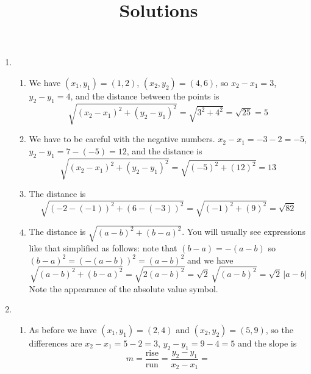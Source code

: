 \documentclass{article}
\title{\commonPSTitleZeroZeroB\ Solutions}
\author{\commonAuthor}
\date{\commonDateZeroZeroB}
\newcommand{\ds}{\displaystyle}
\begin{document}
\maketitle
\begin{enumerate}
\item %
  \begin{enumerate}
  \item %
    We have $(x_1,y_1)=(1,2)$, $(x_2,y_2)=(4,6)$, so $x_2-x_1=3$,
    $y_2-y_1=4$, and the distance between the points is 
    \begin{equation*}
      \sqrt{(x_2-x_1)^2+(y_2-y_1)^2} = \sqrt{3^2+4^2} = \sqrt{25} = 5
    \end{equation*}
  \item %
    We have to be careful with the negative numbers.
    $x_2-x_1=-3-2=-5$, $y_2-y_1=7-(-5)=12$, and the distance is
    \begin{equation*}
      \sqrt{(x_2-x_1)^2+(y_2-y_1)^2} = \sqrt{(-5)^2+(12)^2} = 13
    \end{equation*}
  \item %
    The distance is
    \begin{equation*}
      \sqrt{(-2-(-1))^2 + (6-(-3))^2} = \sqrt{(-1)^2+(9)^2}=\sqrt{82}
    \end{equation*}
  \item %
    The distance is $\sqrt{(a-b)^2+(b-a)^2}$.  You will usually see
    expressions like that simplified as follows: note that
    $(b-a)=-(a-b)$ so $(b-a)^2 = (-(a-b))^2 = (a-b)^2$ and we have
    \begin{equation*}
      \sqrt{(a-b)^2+(b-a)^2} = \sqrt{2(a-b)^2} = \sqrt{2} \,
      \sqrt{(a-b)^2} = \sqrt{2} \, |a-b|
    \end{equation*}
    Note the appearance of the absolute value symbol.
  \end{enumerate}
\item %
  \begin{enumerate}
  \item %
    As before we have $(x_1,y_1) = (2,4)$ and $(x_2,y_2) = (5,9)$, so
    the differences are $x_2-x_1=5-2=3$, $y_2-y_1=9-4=5$ and the slope
    is
    \begin{equation*}
      m = \frac{\mbox{rise}}{\mbox{run}} = \frac{y_2-y_1}{x_2-x_1} =

\end{equation*}
\end{enumerate}
\end{enumerate}
\end{document}
